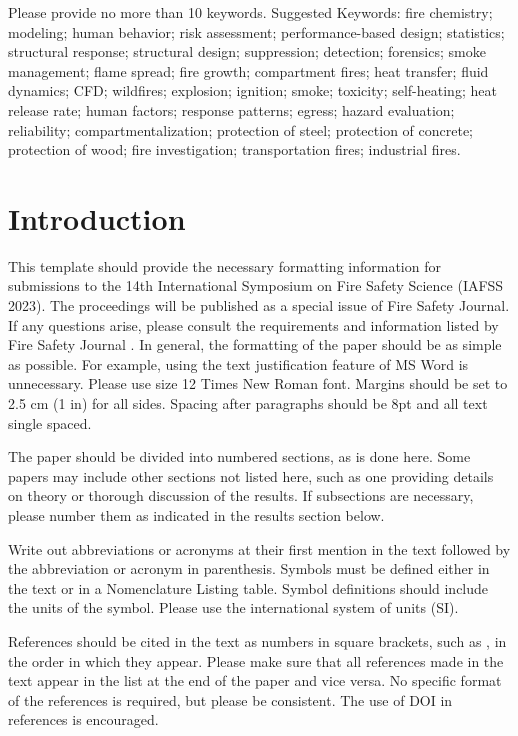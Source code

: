 \documentclass[fleqn,letterpaper,12pt]{article}
\begin{document}
Please provide no more than 10 keywords.  Suggested Keywords: fire chemistry; modeling; human behavior; risk assessment; performance-based design; statistics; structural response; structural design; suppression; detection; forensics; smoke management; flame spread; fire growth; compartment fires; heat transfer; fluid dynamics; CFD; wildfires; explosion; ignition; smoke; toxicity; self-heating; heat release rate; human factors; response patterns; egress; hazard evaluation; reliability; compartmentalization; protection of steel; protection of concrete; protection of wood; fire investigation; transportation fires; industrial fires.

\section{Introduction}

This template should provide the necessary formatting information for submissions to the 14th International Symposium on Fire Safety Science (IAFSS 2023).  The proceedings will be published as a special issue of Fire Safety Journal.  If any questions arise, please consult the requirements and information listed by Fire Safety Journal \cite{Example}.  In general, the formatting of the paper should be as simple as possible.  For example, using the text justification feature of MS Word is unnecessary.  Please use size 12 Times New Roman font.  Margins should be set to 2.5 cm (1 in) for all sides.  Spacing after paragraphs should be 8pt and all text single spaced.

The paper should be divided into numbered sections, as is done here.  Some papers may include other sections not listed here, such as one providing details on theory or thorough discussion of the results.  If subsections are necessary, please number them as indicated in the results section below.

Write out abbreviations or acronyms at their first mention in the text followed by the abbreviation or acronym in parenthesis.  Symbols must be defined either in the text or in a Nomenclature Listing table.  Symbol definitions should include the units of the symbol.  Please use the international system of units (SI).

References should be cited in the text as numbers in square brackets, such as \cite{Example}, in the order in which they appear.  Please make sure that all references made in the text appear in the list at the end of the paper and vice versa.  No specific format of the references is required, but please be consistent.  The use of DOI in references is encouraged. \nocite{Drysdale:1,Magnussen:1,SFPE:Beyler,Rehm:1}
\end{document}
